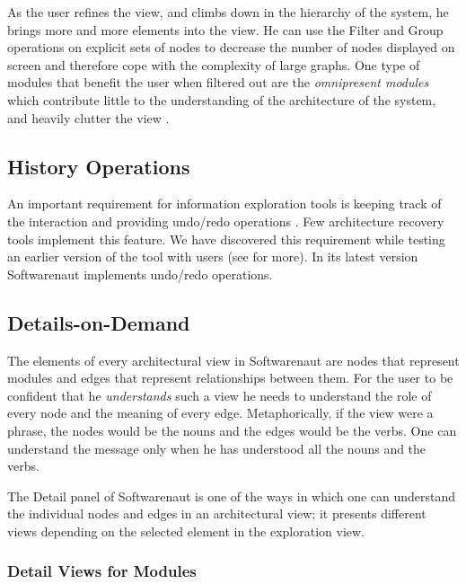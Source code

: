 \documentclass[preprint,12pt]{elsarticle}
\begin{document}
As the user refines the view, and climbs down in the hierarchy of the system, he brings more and more elements into the view. He can use the Filter and Group operations on explicit sets of nodes to decrease the number of nodes displayed on screen and therefore cope with the complexity of large graphs. One type of modules that benefit the user when filtered out are the {\em omnipresent modules} which contribute little to the understanding of the architecture of the system, and heavily clutter the view \cite{mitchell-bunch}.

\subsection {History Operations} 

An important requirement for information exploration tools is keeping track of the interaction and providing undo/redo operations \cite{shneid-eyes}. Few architecture recovery tools implement this feature. We have discovered this requirement while testing an earlier version of the tool with users (see  for more). In its latest version Softwarenaut implements undo/redo operations.



\subsection {Details-on-Demand} 

The elements of every architectural view in Softwarenaut are nodes that represent modules and edges that represent relationships between them. For the user to be confident that he {\em understands} such a view he needs to understand the role of every node and the meaning of every edge. Metaphorically, if the view were a phrase, the nodes would be the nouns and the edges would be the verbs. One can understand the message only when he has understood all the nouns and the verbs.

The Detail panel of Softwarenaut is one of the ways in which one can understand the individual nodes and edges in an architectural view; it presents different views depending on the selected element in the exploration view. 

\subsubsection {Detail Views for Modules}
\end{document}
